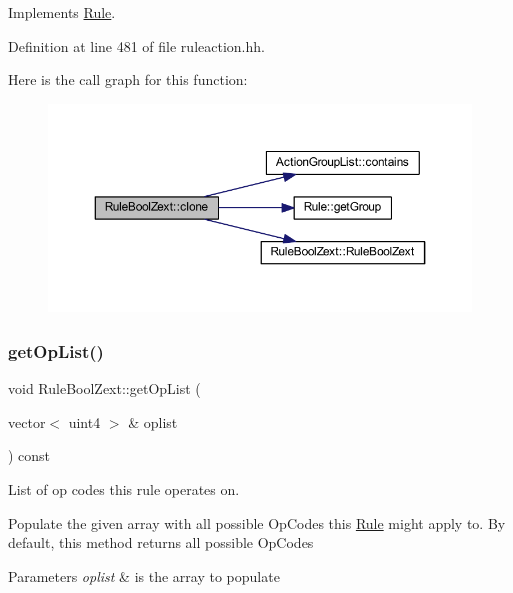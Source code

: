 Implements \mbox{\hyperlink{class_rule_a70de90a76461bfa7ea0b575ce3c11e4d}{Rule}}.



Definition at line 481 of file ruleaction.\+hh.

Here is the call graph for this function\+:
\nopagebreak
\begin{figure}[H]
\begin{center}
\leavevmode
\includegraphics[width=350pt]{class_rule_bool_zext_a481738bbe3367de5a74cc535a6fe86d5_cgraph}
\end{center}
\end{figure}
\mbox{\label{class_rule_bool_zext_a5acd5e378d1dba2e77ec6ccce4754d43}} 
\subsubsection{\texorpdfstring{getOpList()}{getOpList()}}
{\footnotesize\ttfamily void Rule\+Bool\+Zext\+::get\+Op\+List (\begin{DoxyParamCaption}\item[{vector$<$ uint4 $>$ \&}]{oplist }\end{DoxyParamCaption}) const\hspace{0.3cm}{\ttfamily [virtual]}}



List of op codes this rule operates on. 

Populate the given array with all possible Op\+Codes this \mbox{\hyperlink{class_rule}{Rule}} might apply to. By default, this method returns all possible Op\+Codes 
\begin{DoxyParams}{Parameters}
{\em oplist} & is the array to populate \\
\hline
\end{DoxyParams}


